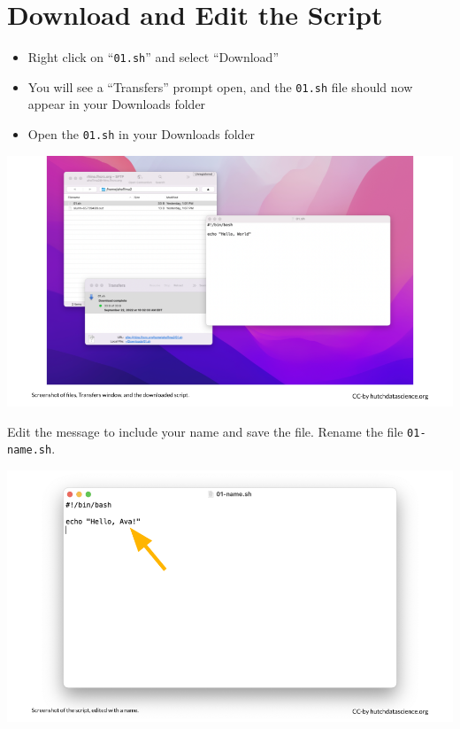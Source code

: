 \documentclass[
]{book}
\providecommand{\tightlist}{%
  \setlength{\itemsep}{0pt}\setlength{\parskip}{0pt}}
\begin{document}
\hypertarget{download-and-edit-the-script}{%
\section{Download and Edit the Script}\label{download-and-edit-the-script}}

\begin{itemize}
\tightlist
\item
  Right click on ``\texttt{01.sh}'' and select ``Download''
\item
  You will see a ``Transfers'' prompt open, and the \texttt{01.sh} file should now appear in your Downloads folder
\item
  Open the \texttt{01.sh} in your Downloads folder
\end{itemize}

\includegraphics[width=1\linewidth]{resources/images/06-upload-download_files/figure-latex//1BQxrVYdKZTbpCaF-i_q9w7s9x034lEXpQZDU-Sl09cs_g1579ffd7b01_12_41}

Edit the message to include your name and save the file. Rename the file \texttt{01-name.sh}.

\includegraphics[width=1\linewidth]{resources/images/06-upload-download_files/figure-latex//1BQxrVYdKZTbpCaF-i_q9w7s9x034lEXpQZDU-Sl09cs_g1579ffd7b01_12_45}
\end{document}
